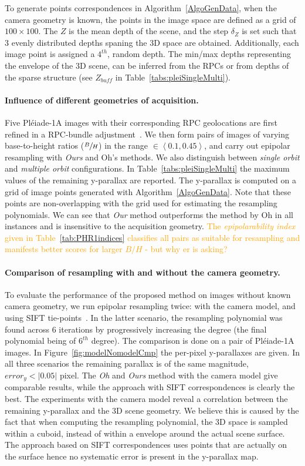 \documentclass{ipol}
\newcommand{\er}[1]{\textcolor{orange}{#1}}
\begin{document}
To generate points correspondences in Algorithm~\ref{AlgoGenData}, when the camera geometry is known, the points in the image space are defined as a grid of $100 \times 100$. The $Z$ is the mean depth of the scene, and the step $\delta_Z$ is set such that 3 evenly distributed depths spaning the 3D space are obtained. Additionally, each image point is assigned a $4^{th}$, random depth.  The min/max depths representing the envelope of the 3D scene, can be inferred from the RPCs or from  depths of the sparse structure (see $Z_{buff}$ in Table~\ref{tabs:pleiSingleMulti}).  
 

\paragraph{Influence of different geometries of acquisition.}
% 
Five Pl\'eiade-1A  images with their corresponding RPC geolocations are first refined in a RPC-bundle adjustment~\cite{rupnika2016refined}. We then form pairs of images of varying base-to-height ratios ($\sfrac{B}{H}$) in the range $\in \left< 0.1,0.45 \right> $, and carry out epipolar resampling with \textit{Ours} and Oh's methods. We also distinguish between \textit{single orbit} and \textit{multiple orbit} configurations. In Table~\ref{tabs:pleiSingleMulti} the maximum values of the remaining y-parallax are reported. The y-parallax is computed on a grid of image points generated with Algorithm~\ref{AlgoGenData}. Note that these points are non-overlapping with the grid used for estimating the resampling polynomials. We can see that \textit{Our} method outperforms the method by Oh in all instances and is insensitive to the acquisition geometry. \er{The \textit{epipolarability index} given in Table~\ref{tab:PHR1indices} classifies all pairs as suitable for resampling and manifests better scores for larger $B/H$ - but why er is asking?}
 
\paragraph{Comparison of resampling with and without the camera geometry.}
To evaluate the performance of the proposed method on images without known camera geometry, we run epipolar resampling twice: with the camera model, and using SIFT tie-points~\cite{lowe2004distinctive}. In the latter scenario, the resampling polynomial was found across 6 iterations by progressively increasing the degree (the final polynomial being of $6^{th}$ degree). The comparison is done on a pair of Pl\'eiade-1A images. In Figure~\ref{fig:modelNomodelCmp} the per-pixel y-parallaxes are given. In all three scenarios the remaining parallax is of the same magnitude, $error_{y}< |0.05|$ pixel. The \textit{Oh} and \textit{Ours} method with the camera model give comparable results, while the approach with SIFT correspondences is clearly the best. The experiments with the camera model reveal a correlation between the remaining y-parallax and the 3D scene geometry. We believe this is caused by the fact that when computing the resampling polynomial, the 3D space is sampled within a cuboid, instead of within a envelope around the actual scene surface. The approach based on SIFT correspondences uses points that are actually on the surface hence no systematic error is present in the y-parallax map.
%
\end{document}
